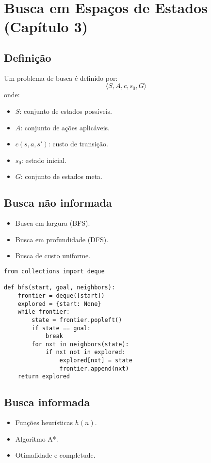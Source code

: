 \documentclass[9pt,a4paper]{extarticle}
\begin{document}
\section{Busca em Espaços de Estados (Capítulo 3)}

\subsection*{Definição}
Um problema de busca é definido por:
\[
\langle S, A, c, s_0, G \rangle
\]
onde:
\begin{itemize}
  \item $S$: conjunto de estados possíveis.
  \item $A$: conjunto de ações aplicáveis.
  \item $c(s,a,s')$: custo de transição.
  \item $s_0$: estado inicial.
  \item $G$: conjunto de estados meta.
\end{itemize}

\subsection*{Busca não informada}
\begin{itemize}
  \item Busca em largura (BFS).
  \item Busca em profundidade (DFS).
  \item Busca de custo uniforme.
\end{itemize}

\begin{lstlisting}
from collections import deque

def bfs(start, goal, neighbors):
    frontier = deque([start])
    explored = {start: None}
    while frontier:
        state = frontier.popleft()
        if state == goal:
            break
        for nxt in neighbors(state):
            if nxt not in explored:
                explored[nxt] = state
                frontier.append(nxt)
    return explored
\end{lstlisting}

\subsection*{Busca informada}
\begin{itemize}
  \item Funções heurísticas $h(n)$.
  \item Algoritmo A*.
  \item Otimalidade e completude.
\end{itemize}
\end{document}
